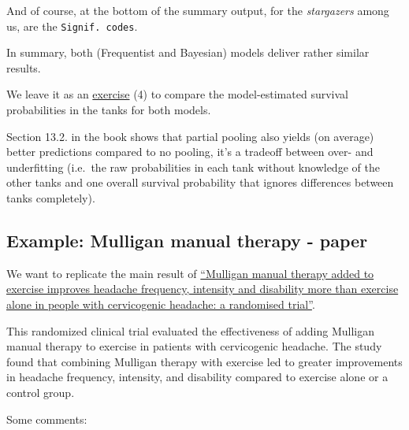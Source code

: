 \documentclass[
]{book}
\begin{document}
And of course, at the bottom of the summary output, for the \emph{stargazers} among us, are the \texttt{Signif.\ codes}.

In summary, both (Frequentist and Bayesian) models deliver rather similar results.

We leave it as an \hyperref[exercise4_LMM]{exercise} (4) to compare the model-estimated survival probabilities
in the tanks for both models.

Section 13.2. in the book shows that partial pooling also yields (on average) better
predictions compared to no pooling, it's a tradeoff between over- and underfitting
(i.e.~the raw probabilities in each tank without knowledge of the other tanks and one
overall survival probability that ignores differences between tanks completely).

\subsection{Example: Mulligan manual therapy - paper}\label{mulligan}

We want to replicate the main result of
\href{https://doi.org/10.1016/j.jphys.2024.06.002}{``Mulligan manual therapy added to exercise improves headache frequency,
intensity and disability more than exercise alone in people with cervicogenic
headache: a randomised trial''}.

This randomized clinical trial evaluated the effectiveness of adding Mulligan manual therapy
to exercise in patients with cervicogenic headache. The study found that combining
Mulligan therapy with exercise led to greater improvements in headache frequency,
intensity, and disability compared to exercise alone or a control group.

Some comments:
\end{document}
